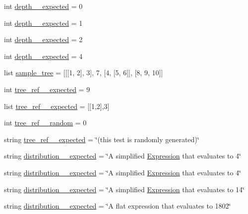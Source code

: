 \begin{DoxyCompactItemize}
\item 
int \hyperlink{namespacetests_ace0d3b9c40d408671c0564c236a60f96}{depth\+\_\+\_\+expected} = 0
\item 
int \hyperlink{namespacetests_aecfdfc44efea714a24eac9a168acb28c}{depth\+\_\+\_\+expected} = 1
\item 
int \hyperlink{namespacetests_a5309d131cd043036f4d4bb0978560ffb}{depth\+\_\+\_\+expected} = 2
\item 
int \hyperlink{namespacetests_a7bcc68cb7c037783d18f13dbac431f79}{depth\+\_\+\_\+expected} = 4
\item 
list \hyperlink{namespacetests_aed50057d4b41d5c384706e2092ba8639}{sample\+\_\+tree} = \mbox{[}\mbox{[}\mbox{[}1, 2\mbox{]}, 3\mbox{]}, 7, \mbox{[}4, \mbox{[}5, 6\mbox{]}\mbox{]}, \mbox{[}8, 9, 10\mbox{]}\mbox{]}
\item 
int \hyperlink{namespacetests_ab4e82067e2778125c60ee17784126f1b}{tree\+\_\+ref\+\_\+\_\+expected} = 9
\item 
list \hyperlink{namespacetests_a0909c7dfe851ffd4417287e08b3ef0bd}{tree\+\_\+ref\+\_\+\_\+expected} = \mbox{[}\mbox{[}1,2\mbox{]},3\mbox{]}
\item 
int \hyperlink{namespacetests_a5525abd2a0e34f4c6481fcaabd7b0ce8}{tree\+\_\+ref\+\_\+\_\+random} = 0
\item 
string \hyperlink{namespacetests_af16279d713a3630d67f4cfa0d442e2f9}{tree\+\_\+ref\+\_\+\_\+expected} = \char`\"{}(this test is randomly generated)\char`\"{}
\item 
string \hyperlink{namespacetests_a7eb27246e80d01e52ba180333c6ea32b}{distribution\+\_\+\_\+expected} = \char`\"{}A simplified \hyperlink{classalgebra_1_1_expression}{Expression} that evaluates to 4\char`\"{}
\item 
string \hyperlink{namespacetests_a1697cfb257a399ad17adc3d1416b835b}{distribution\+\_\+\_\+expected} = \char`\"{}A simplified \hyperlink{classalgebra_1_1_expression}{Expression} that evaluates to 4\char`\"{}
\item 
string \hyperlink{namespacetests_a9a4fd4037ef869ed070a1cbe27ffd548}{distribution\+\_\+\_\+expected} = \char`\"{}A simplified \hyperlink{classalgebra_1_1_expression}{Expression} that evaluates to \textquotesingle{}14\textquotesingle{}\char`\"{}
\item 
string \hyperlink{namespacetests_aac9d9c1112c89b1661fc020d30021881}{distribution\+\_\+\_\+expected} = \char`\"{}A flat expression that evaluates to 1802\char`\"{}
\item 

\end{DoxyCompactItemize}
